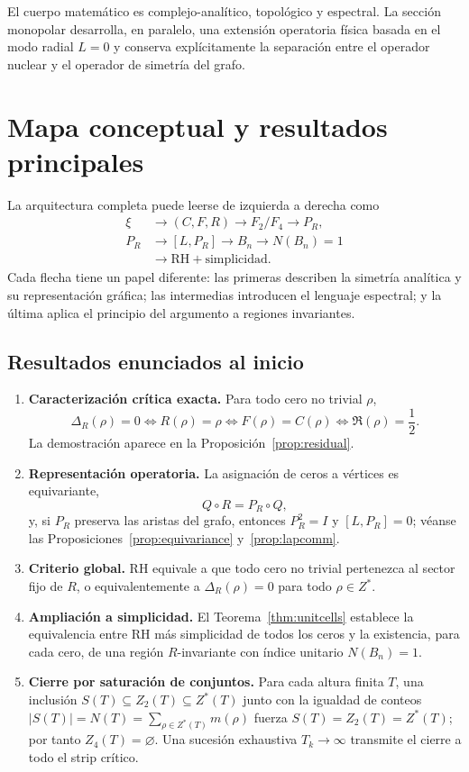 \documentclass[11pt]{amsart}
\theoremstyle{definition}
\theoremstyle{remark}
\begin{document}
El cuerpo matemático es complejo-analítico, topológico y espectral. La sección monopolar desarrolla, en paralelo, una extensión operatoria física basada en el modo radial $L=0$ y conserva explícitamente la separación entre el operador nuclear y el operador de simetría del grafo.

\section{Mapa conceptual y resultados principales}\label{sec:mainresults}
La arquitectura completa puede leerse de izquierda a derecha como
\begin{equation}\label{eq:roadmap}
\boxed{\begin{aligned}
\xi &\longrightarrow (C,F,R)\longrightarrow F_2/F_4\longrightarrow P_R,\\
P_R &\longrightarrow [L,P_R]\longrightarrow B_n\longrightarrow N(B_n)=1\\
&\longrightarrow \mathrm{RH}+\text{simplicidad}.
\end{aligned}}
\end{equation}
Cada flecha tiene un papel diferente: las primeras describen la simetría analítica y su representación gráfica; las intermedias introducen el lenguaje espectral; y la última aplica el principio del argumento a regiones invariantes.

\subsection{Resultados enunciados al inicio}
\begin{enumerate}[label=\textbf{R\arabic*.},leftmargin=*]
\item \textbf{Caracterización crítica exacta.} Para todo cero no trivial $\rho$,
\[
\Delta_R(\rho)=0\iff R(\rho)=\rho\iff F(\rho)=C(\rho)\iff \Re(\rho)=\frac12.
\]
La demostración aparece en la Proposición~\ref{prop:residual}.
\item \textbf{Representación operatoria.} La asignación de ceros a vértices es equivariante,
\[
Q\circ R=P_R\circ Q,
\]
y, si $P_R$ preserva las aristas del grafo, entonces $P_R^2=I$ y $[L,P_R]=0$; véanse las Proposiciones~\ref{prop:equivariance} y~\ref{prop:lapcomm}.
\item \textbf{Criterio global.} RH equivale a que todo cero no trivial pertenezca al sector fijo de $R$, o equivalentemente a $\Delta_R(\rho)=0$ para todo $\rho\in Z^*$.
\item \textbf{Ampliación a simplicidad.} El Teorema~\ref{thm:unitcells} establece la equivalencia entre RH más simplicidad de todos los ceros y la existencia, para cada cero, de una región $R$-invariante con índice unitario $N(B_n)=1$.
\item \textbf{Cierre por saturación de conjuntos.} Para cada altura finita $T$, una inclusión $S(T)\subseteq Z_2(T)\subseteq Z^*(T)$ junto con la igualdad de conteos $|S(T)|=N(T)=\sum_{\rho\in Z^*(T)}m(\rho)$ fuerza $S(T)=Z_2(T)=Z^*(T)$; por tanto $Z_4(T)=\varnothing$. Una sucesión exhaustiva $T_k\to\infty$ transmite el cierre a todo el strip crítico.
\end{enumerate}
\end{document}
